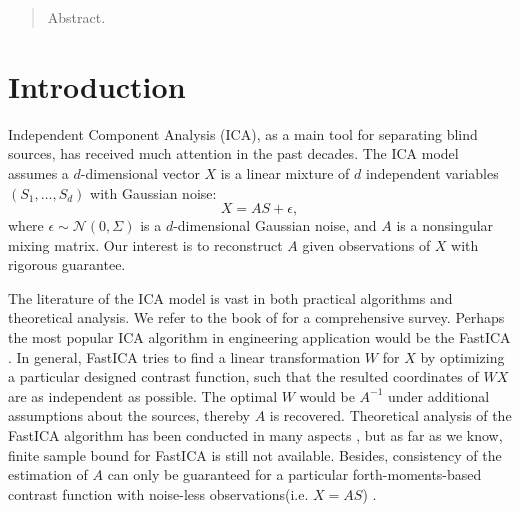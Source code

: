 \documentclass[twoside]{article}
\theoremstyle{definition}
\begin{document}
%

%


\begin{abstract}
Abstract.
\end{abstract}

\section{Introduction}
\label{sec:Intro}
Independent Component Analysis (ICA), as a main tool for separating blind sources, has received much attention in the past decades. 
The ICA model assumes a $d$-dimensional vector $X$ is a linear mixture of $d$ independent variables $(S_1,\ldots, S_d)$ with Gaussian noise:
\[
X = AS+\epsilon,
\]
where $\epsilon \sim \mathcal{N}(0,\Sigma)$ is a $d$-dimensional Gaussian noise, and $A$ is a nonsingular mixing matrix.
Our interest is to reconstruct $A$ given observations of $X$ with rigorous guarantee.

The literature of the ICA model is vast in both practical algorithms and theoretical analysis. 
We refer to the book of \citet{comon2010handbook} for a comprehensive survey.
Perhaps the most popular ICA algorithm in engineering application would be the FastICA \citep{hyvarinen1999fast}. 
In general, FastICA tries to find a linear transformation $W$ for $X$ by optimizing a particular designed contrast function, 
such that the resulted coordinates of $WX$ are as independent as possible. 
The optimal $W$ would be $A^{-1}$ under additional assumptions about the sources, thereby $A$ is recovered.  
Theoretical analysis of the FastICA algorithm has been conducted in many aspects \citep{tichavsky2006performance,oja2006fastica,ollila2010deflation,dermoune2013fastica,wei2014convergence}, 
but as far as we know, finite sample bound for FastICA is still not available.
Besides, consistency of the estimation of $A$ can only be guaranteed for a particular forth-moments-based contrast function with noise-less observations(i.e. $X = AS$) \citep{miettinen2014fourth}. 
\end{document}
